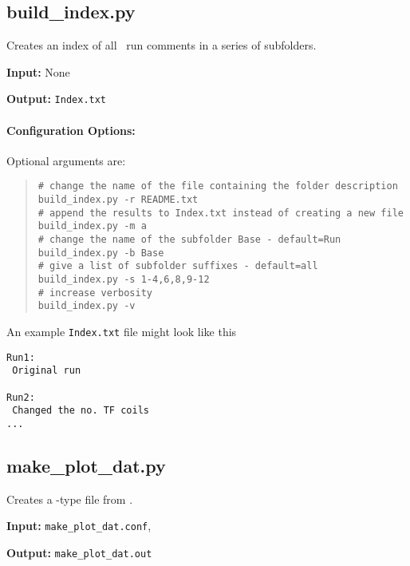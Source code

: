 \subsection{build\_index.py}

Creates an index of all \process\ run comments in a series of subfolders.

\begin{description}
\item{\textbf{Input:}}
None
                                
\item{\textbf{Output:}}
\verb|Index.txt|
\end{description}

\paragraph{Configuration Options:}

Optional arguments are:
\begin{quote}
\begin{verbatim}
# change the name of the file containing the folder description
build_index.py -r README.txt 
# append the results to Index.txt instead of creating a new file
build_index.py -m a
# change the name of the subfolder Base - default=Run
build_index.py -b Base 
# give a list of subfolder suffixes - default=all
build_index.py -s 1-4,6,8,9-12 
# increase verbosity
build_index.py -v
\end{verbatim}
\end{quote}

An example \texttt{Index.txt} file might look like this
\begin{framed}
\begin{verbatim}
Run1:
 Original run

Run2:
 Changed the no. TF coils
...
\end{verbatim}
\end{framed}

\subsection{make\_plot\_dat.py}

Creates a \plotdat-type file from \mfile.

\begin{description}
\item{\textbf{Input:}}
\verb|make_plot_dat.conf|, \mfile\
                                
\item{\textbf{Output:}}
\verb|make_plot_dat.out|
\end{description}

